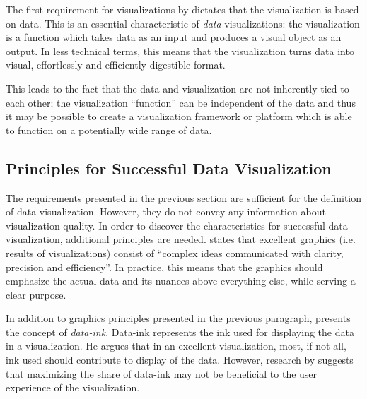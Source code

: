 The first requirement for visualizations by \citet{kosara_visualization_2007} dictates that the visualization is based on data. This is an essential characteristic of \emph{data} visualizations: the visualization is a function which takes data as an input and produces a visual object as an output. In less technical terms, this means that the visualization turns data into visual, effortlessly and efficiently digestible format.

This leads to the fact that the data and visualization are not inherently tied to each other; the visualization ``function'' can be independent of the data and thus it may be possible to create a visualization framework or platform which is able to function on a potentially wide range of data.



\subsection{Principles for Successful Data Visualization}

The requirements presented in the previous section are sufficient for the definition of data visualization. However, they do not convey any information about visualization quality. In order to discover the characteristics for successful data visualization, additional principles are needed. \citet[p.~13]{tufte_visual_1986} states that excellent graphics (i.e. results of visualizations) consist of ``complex ideas communicated with clarity, precision and efficiency''. In practice, this means that the graphics should emphasize the actual data and its nuances above everything else, while serving a clear purpose.

In addition to graphics principles presented in the previous paragraph, \citet[p.~93]{tufte_visual_1986} presents the concept of \emph{data-ink}. Data-ink represents the ink used for displaying the data in a visualization. He argues that in an excellent visualization, most, if not all, ink used should contribute to display of the data. However, research by \citet{inbar_minimalism_2007} suggests that maximizing the share of data-ink may not be beneficial to the user experience of the visualization. 

